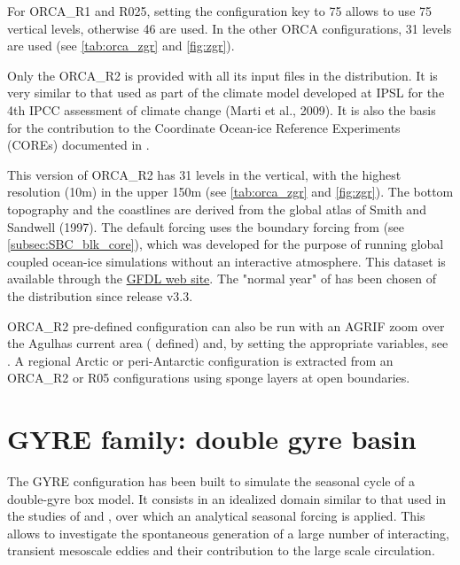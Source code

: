 \documentclass[../main/NEMO_manual]{subfiles}
\begin{document}
For ORCA\_R1 and R025, setting the configuration key to 75 allows to use 75 vertical levels, otherwise 46 are used.
In the other ORCA configurations, 31 levels are used
(see \autoref{tab:orca_zgr}  and \autoref{fig:zgr}).

Only the ORCA\_R2 is provided with all its input files in the \NEMO distribution.
It is very similar to that used as part of the climate model developed at IPSL for the 4th IPCC assessment of
climate change (Marti et al., 2009).
It is also the basis for the \NEMO contribution to the Coordinate Ocean-ice Reference Experiments (COREs)
documented in \citet{Griffies_al_OM09}. 

This version of ORCA\_R2 has 31 levels in the vertical, with the highest resolution (10m) in the upper 150m
(see \autoref{tab:orca_zgr} and \autoref{fig:zgr}). 
The bottom topography and the coastlines are derived from the global atlas of Smith and Sandwell (1997). 
The default forcing uses the boundary forcing from \citet{Large_Yeager_Rep04} (see \autoref{subsec:SBC_blk_core}), 
which was developed for the purpose of running global coupled ocean-ice simulations without
an interactive atmosphere.
This \citet{Large_Yeager_Rep04} dataset is available through
the \href{http://nomads.gfdl.noaa.gov/nomads/forms/mom4/CORE.html}{GFDL web site}.
The "normal year" of \citet{Large_Yeager_Rep04} has been chosen of the \NEMO distribution since release v3.3. 

ORCA\_R2 pre-defined configuration can also be run with an AGRIF zoom over the Agulhas current area
( defined) and, by setting the appropriate variables, see .
A regional Arctic or peri-Antarctic configuration is extracted from an ORCA\_R2 or R05 configurations using
sponge layers at open boundaries. 

\section{GYRE family: double gyre basin }
\label{sec:CFG_gyre}

The GYRE configuration \citep{Levy_al_OM10} has been built to
simulate the seasonal cycle of a double-gyre box model.
It consists in an idealized domain similar to that used in the studies of \citet{Drijfhout_JPO94} and
\citet{Hazeleger_Drijfhout_JPO98, Hazeleger_Drijfhout_JPO99, Hazeleger_Drijfhout_JGR00, Hazeleger_Drijfhout_JPO00},
over which an analytical seasonal forcing is applied.
This allows to investigate the spontaneous generation of a large number of interacting, transient mesoscale eddies 
and their contribution to the large scale circulation. 
\end{document}
